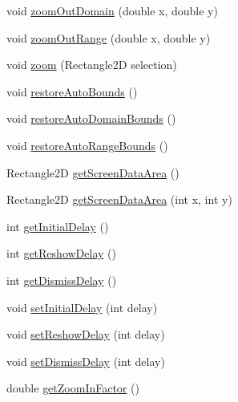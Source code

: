 \begin{DoxyCompactItemize}
\item 
void \mbox{\hyperlink{classorg_1_1jfree_1_1chart_1_1_chart_panel_ac825f01f37b6f74b37df0eba79ed256b}{zoom\+Out\+Domain}} (double x, double y)
\item 
void \mbox{\hyperlink{classorg_1_1jfree_1_1chart_1_1_chart_panel_a2242d982464a13cd3c37d8b9a85ddf74}{zoom\+Out\+Range}} (double x, double y)
\item 
void \mbox{\hyperlink{classorg_1_1jfree_1_1chart_1_1_chart_panel_a38d1f7fc6721aef92a30c0b79ecdaed9}{zoom}} (Rectangle2D selection)
\item 
void \mbox{\hyperlink{classorg_1_1jfree_1_1chart_1_1_chart_panel_ab40f9738c59285af1ba12b3b5ffbf013}{restore\+Auto\+Bounds}} ()
\item 
void \mbox{\hyperlink{classorg_1_1jfree_1_1chart_1_1_chart_panel_aa684c26e400e2609832e49a74405dbeb}{restore\+Auto\+Domain\+Bounds}} ()
\item 
void \mbox{\hyperlink{classorg_1_1jfree_1_1chart_1_1_chart_panel_a8a9de5e50faa0712dffee7c70b927029}{restore\+Auto\+Range\+Bounds}} ()
\item 
Rectangle2D \mbox{\hyperlink{classorg_1_1jfree_1_1chart_1_1_chart_panel_adf48c288fcd8f61ea66193ab08b7a95d}{get\+Screen\+Data\+Area}} ()
\item 
Rectangle2D \mbox{\hyperlink{classorg_1_1jfree_1_1chart_1_1_chart_panel_ad89851837dc081fbdc260e62b6543528}{get\+Screen\+Data\+Area}} (int x, int y)
\item 
int \mbox{\hyperlink{classorg_1_1jfree_1_1chart_1_1_chart_panel_aabe90bcffc385f5bcb14b83757a2bc27}{get\+Initial\+Delay}} ()
\item 
int \mbox{\hyperlink{classorg_1_1jfree_1_1chart_1_1_chart_panel_a56547921c8a93a49173c18f43e0890e6}{get\+Reshow\+Delay}} ()
\item 
int \mbox{\hyperlink{classorg_1_1jfree_1_1chart_1_1_chart_panel_a994388195453a476f332416e6966b1c9}{get\+Dismiss\+Delay}} ()
\item 
void \mbox{\hyperlink{classorg_1_1jfree_1_1chart_1_1_chart_panel_a42b50d91afaf348313f2a508956195db}{set\+Initial\+Delay}} (int delay)
\item 
void \mbox{\hyperlink{classorg_1_1jfree_1_1chart_1_1_chart_panel_ad2a0f0af88a7e32e2491cd754bc74328}{set\+Reshow\+Delay}} (int delay)
\item 
void \mbox{\hyperlink{classorg_1_1jfree_1_1chart_1_1_chart_panel_a307cbf4935c44eb969d06ed50dd0c261}{set\+Dismiss\+Delay}} (int delay)
\item 
double \mbox{\hyperlink{classorg_1_1jfree_1_1chart_1_1_chart_panel_a43dfc4192b55821224ea51b414f7494c}{get\+Zoom\+In\+Factor}} ()

\end{DoxyCompactItemize}
